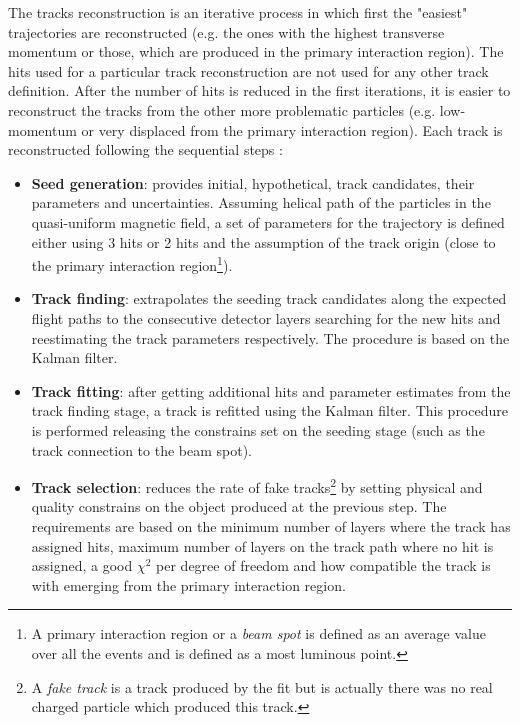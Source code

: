 The tracks reconstruction is an iterative process in which first the "easiest" trajectories are reconstructed (e.g. the ones with the highest
transverse momentum or those, which are produced in the primary interaction region). The hits used for a particular track reconstruction 
are not used for any other track definition. After the number of hits is reduced in the first iterations, it is easier to reconstruct the
tracks from the other more problematic particles (e.g. low-momentum or very displaced from the primary interaction region). Each track is reconstructed
following the sequential steps \cite{Chatrchyan:2014fea}:

\begin{itemize}
 \item \textbf{Seed generation}: provides initial, hypothetical, track candidates, their parameters and uncertainties. Assuming helical path of the particles in the
 quasi-uniform magnetic field, a set of parameters for the trajectory is defined either using 3 hits or 2 hits and the assumption
 of the track origin (close to the primary interaction region\footnote{A primary interaction region or a \textit{beam spot} is defined 
 as an average value over all the events and is defined as a most luminous point.}).
 \item \textbf{Track finding}: extrapolates the seeding track candidates along the expected flight paths to the consecutive detector layers searching 
 for the new hits and reestimating the track parameters respectively. The procedure is based on the Kalman filter\cite{Fruhwirth:1987fm}.
 \item \textbf{Track fitting}: after getting additional hits and parameter estimates from the track finding stage, a track is refitted using the 
 Kalman filter. This procedure is performed releasing the constrains set on the seeding stage (such as the track connection to the beam spot).
 \item \textbf{Track selection}: reduces the rate of fake tracks\footnote{A \textit{fake track} is a track produced by the fit but is actually there was
 no real charged particle which produced this track.} by setting physical and quality constrains on the object produced at the previous step. The requirements
 are based on the minimum number of layers where the track has assigned hits, maximum number of layers on the track path where no hit is assigned,
 a good $\chi^{2}$ per degree of freedom and how compatible the track is with emerging from the primary interaction region.
\end{itemize}

